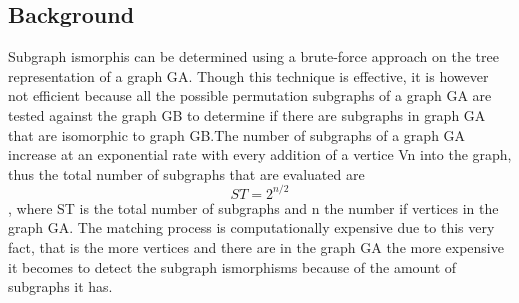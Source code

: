 \label{Ullman Algorithm}



\subsection{Background}
Subgraph ismorphis can be determined using a brute-force approach on the tree representation of a graph G{\tiny A}. Though this technique is effective, it is however not efficient because all the possible
permutation subgraphs of a graph G{\tiny A} are tested against the graph G{\tiny B} to determine if there are subgraphs in graph G{\tiny A} that are isomorphic to graph G{\tiny B}.The number of subgraphs of a graph G{\tiny A} increase at an exponential rate with every addition of a vertice Vn into the graph, thus the total number of subgraphs that are evaluated are  
	\begin{equation}
		ST = 2^{n/2}
	\end{equation} 
, where ST is the total
number of subgraphs and n the number if vertices in the graph G{\tiny A}.
The matching process is computationally expensive due to this very fact, that is the more vertices and there are in the graph G{\tiny A} the more expensive it becomes to detect the subgraph ismorphisms
because of the amount of subgraphs it has.

